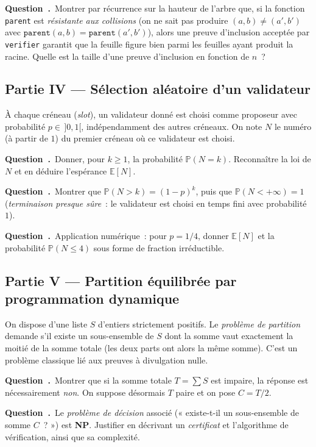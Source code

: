 \documentclass[11pt,a4paper]{article}
\newcounter{qcnt}
\newcommand{\Q}{\medskip\par\stepcounter{qcnt}\noindent\textbf{Question~\theqcnt.}~}
\newcommand{\code}[1]{\lstinline!#1!}
\begin{document}
\Q Montrer par récurrence sur la hauteur de l'arbre que, si la fonction \code{parent} est
\emph{résistante aux collisions} (on ne sait pas produire $ (a,b) \ne (a',b')$ avec
$\mathtt{parent}(a,b) = \mathtt{parent}(a',b')$), alors une preuve d'inclusion acceptée par
\code{verifier} garantit que la feuille figure bien parmi les feuilles ayant produit la racine.
Quelle est la taille d'une preuve d'inclusion en fonction de $n$~?

\subsection*{Partie IV --- Sélection aléatoire d'un validateur}

À chaque créneau (\emph{slot}), un validateur donné est choisi comme proposeur avec probabilité
$p \in\, ]0,1[$, indépendamment des autres créneaux. On note $N$ le numéro (à partir de $1$) du
premier créneau où ce validateur est choisi.

\Q Donner, pour $k \ge 1$, la probabilité $\mathbb{P}(N = k)$. Reconnaître la loi de $N$ et en
déduire l'espérance $\mathbb{E}[N]$.

\Q Montrer que $\mathbb{P}(N > k) = (1-p)^{k}$, puis que $\mathbb{P}(N < +\infty) = 1$
(\emph{terminaison presque sûre}~: le validateur est choisi en temps fini avec probabilité $1$).

\Q Application numérique~: pour $p = 1/4$, donner $\mathbb{E}[N]$ et la probabilité
$\mathbb{P}(N \le 4)$ sous forme de fraction irréductible.

\subsection*{Partie V --- Partition équilibrée par programmation dynamique}

On dispose d'une liste $S$ d'entiers strictement positifs. Le \emph{problème de partition}
demande s'il existe un sous-ensemble de $S$ dont la somme vaut exactement la moitié de la somme
totale (les deux parts ont alors la même somme). C'est un problème classique lié aux preuves à
divulgation nulle.

\Q Montrer que si la somme totale $T = \sum S$ est impaire, la réponse est nécessairement
\emph{non}. On suppose désormais $T$ paire et on pose $C = T/2$.

\Q Le \emph{problème de décision} associé (« existe-t-il un sous-ensemble de somme $C$~? ») est
\textbf{NP}. Justifier en décrivant un \emph{certificat} et l'algorithme de vérification, ainsi
que sa complexité.
\end{document}
